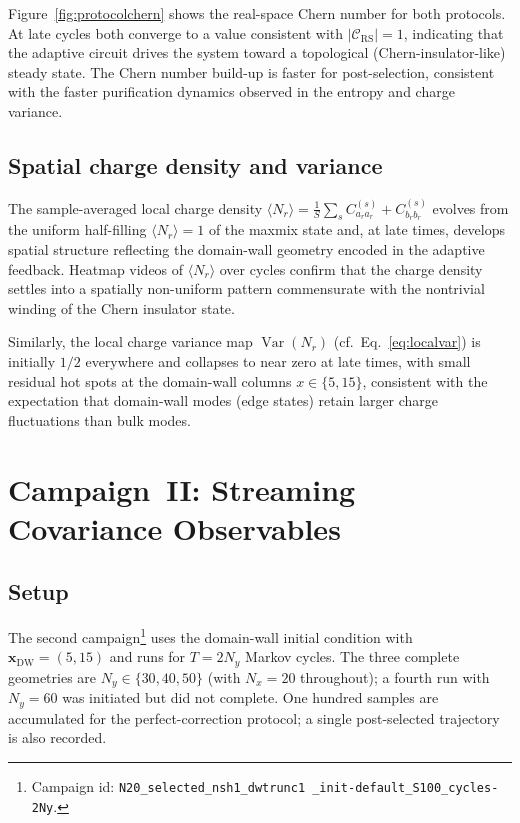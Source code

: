 \documentclass[twocolumn,aps,prx,10pt,floatfix]{revtex4-2}
\begin{document}
Figure~\ref{fig:protocolchern} shows the real-space Chern number for both
protocols.  At late cycles both converge to a value consistent with
$|\mathcal{C}_\text{RS}| = 1$, indicating that the adaptive circuit
drives the system toward a topological (Chern-insulator-like) steady state.
The Chern number build-up is faster for post-selection, consistent with the
faster purification dynamics observed in the entropy and charge variance.

\subsection{Spatial charge density and variance}

The sample-averaged local charge density
$\langle N_r\rangle = \frac{1}{S}\sum_s C^{(s)}_{a_r a_r} + C^{(s)}_{b_r b_r}$
evolves from the uniform half-filling $\langle N_r\rangle = 1$ of the
maxmix state and, at late times, develops spatial structure reflecting the
domain-wall geometry encoded in the adaptive feedback.  Heatmap videos
of $\langle N_r\rangle$ over cycles confirm that the charge density
settles into a spatially non-uniform pattern commensurate with the
nontrivial winding of the Chern insulator state.

Similarly, the local charge variance map
$\operatorname{Var}(N_r)$ (cf.\ Eq.~\eqref{eq:localvar}) is initially $1/2$
everywhere and collapses to near zero at late times, with small residual
hot spots at the domain-wall columns $x \in \{5, 15\}$, consistent with
the expectation that domain-wall modes (edge states) retain larger charge
fluctuations than bulk modes.

\clearpage
\section{Campaign~II: Streaming Covariance Observables}
\label{sec:streaming}

\subsection{Setup}

The second campaign\footnote{%
  Campaign id:
  \texttt{N20\_selected\_nsh1\_dwtrunc1%
  \_init-default\_S100\_cycles-2Ny}.}
uses the domain-wall initial condition with $\mathbf{x}_\text{DW} = (5, 15)$
and runs for $T = 2N_y$ Markov cycles.  The three complete geometries are
$N_y \in \{30, 40, 50\}$ (with $N_x = 20$ throughout); a fourth run with
$N_y = 60$ was initiated but did not complete.  One hundred samples are
accumulated for the perfect-correction protocol; a single post-selected
trajectory is also recorded.
\end{document}
